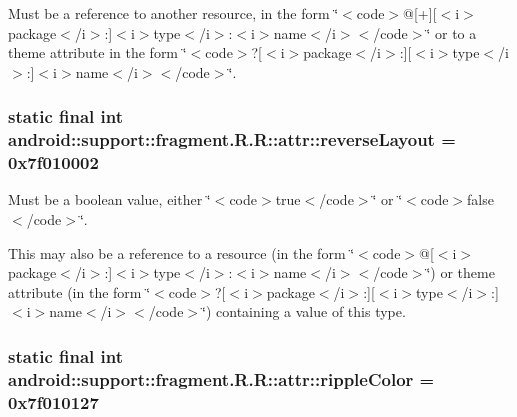 Must be a reference to another resource, in the form \char`\"{}$<$code$>$@\mbox{[}+\mbox{]}\mbox{[}$<$i$>$package$<$/i$>$:\mbox{]}$<$i$>$type$<$/i$>$:$<$i$>$name$<$/i$>$$<$/code$>$\char`\"{} or to a theme attribute in the form \char`\"{}$<$code$>$?\mbox{[}$<$i$>$package$<$/i$>$:\mbox{]}\mbox{[}$<$i$>$type$<$/i$>$:\mbox{]}$<$i$>$name$<$/i$>$$<$/code$>$\char`\"{}. \hypertarget{classandroid_1_1support_1_1fragment_1_1_r_1_1attr_5996eb8dd3c5afa0ad43eccb234e760f}{
\subsubsection[{reverseLayout}]{\setlength{\rightskip}{0pt plus 5cm}static final int android::support::fragment.R.R::attr::reverseLayout = 0x7f010002}}
\label{classandroid_1_1support_1_1fragment_1_1_r_1_1attr_5996eb8dd3c5afa0ad43eccb234e760f}


Must be a boolean value, either \char`\"{}$<$code$>$true$<$/code$>$\char`\"{} or \char`\"{}$<$code$>$false$<$/code$>$\char`\"{}. 

This may also be a reference to a resource (in the form \char`\"{}$<$code$>$@\mbox{[}$<$i$>$package$<$/i$>$:\mbox{]}$<$i$>$type$<$/i$>$:$<$i$>$name$<$/i$>$$<$/code$>$\char`\"{}) or theme attribute (in the form \char`\"{}$<$code$>$?\mbox{[}$<$i$>$package$<$/i$>$:\mbox{]}\mbox{[}$<$i$>$type$<$/i$>$:\mbox{]}$<$i$>$name$<$/i$>$$<$/code$>$\char`\"{}) containing a value of this type. \hypertarget{classandroid_1_1support_1_1fragment_1_1_r_1_1attr_7e412ebf69c38b01750034480239fd31}{
\subsubsection[{rippleColor}]{\setlength{\rightskip}{0pt plus 5cm}static final int android::support::fragment.R.R::attr::rippleColor = 0x7f010127}}
\label{classandroid_1_1support_1_1fragment_1_1_r_1_1attr_7e412ebf69c38b01750034480239fd31}


